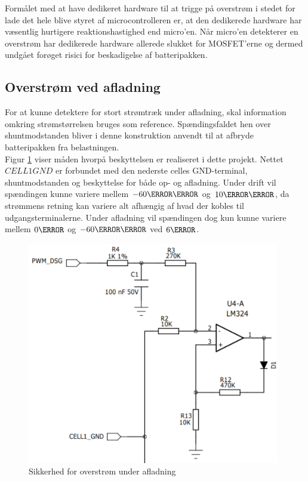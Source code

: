 Formålet med at have dedikeret hardware til at trigge på overstrøm i stedet for lade det hele blive styret af microcontrolleren er, at den dedikerede hardware har væsentlig hurtigere reaktionshastighed end micro'en. Når micro'en detekterer en overstrøm har dedikerede hardware allerede slukket for MOSFET'erne og dermed undgået forøget risici for beskadigelse af batteripakken.
\\

\subsection{Overstrøm ved afladning}
For at kunne detektere for stort strømtræk under afladning, skal information omkring strømstørrelsen bruges som reference. Spændingsfaldet hen over shuntmodstanden bliver i denne konstruktion anvendt til at afbryde batteripakken fra belastningen.
\\

Figur \ref{fig:overcurrent_discharge} viser måden hvorpå beskyttelsen er realiseret i dette projekt. Nettet $CELL1GND$ er forbundet med den nederste celles GND-terminal, shuntmodstanden og beskyttelse for både op- og afladning. Under drift vil spændingen kunne variere mellem $-60\milli\volt$ og $10\milli\volt$, da strømmens retning kan variere alt afhængig af hvad der kobles til udgangsterminalerne. Under afladning vil spændingen dog kun kunne variere mellem $0\volt$ og $-60\milli\volt$ ved $6\ampere$.
\\

\begin{figure}[h]
	\centering
	\includegraphics[width=11cm]{billeder/overcurrent_discharge.png}
	\caption{Sikkerhed for overstrøm under afladning}
	\label{fig:overcurrent_discharge}
\end{figure}

